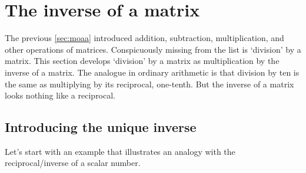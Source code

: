 
\section{The inverse of a matrix}
\label{sec:im}

\secttoc

\begin{comment}
\pooliv{p.163--9}  \layiv{\S2.2--3}  \cite[\S3.2]{Nakos1998}  \cite[Ch.~6]{Chartier2015}
\end{comment}


The previous \autoref{sec:moaa} introduced addition, subtraction, multiplication, and other operations of matrices.  
Conspicuously missing from the list is `division' by a matrix.
This section develops `division' by a matrix as multiplication by the inverse of a matrix.
The analogue in ordinary arithmetic is that division by ten is the same as multiplying by its reciprocal, one-tenth.
But the inverse of a matrix looks nothing like a reciprocal.


\subsection{Introducing the unique inverse}

Let's start with an example that illustrates an analogy with the reciprocal\slash inverse of a scalar number.

